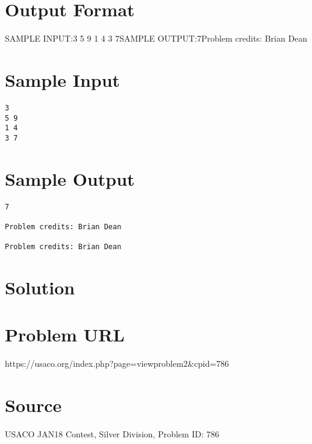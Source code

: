 \documentclass[12pt]{article}
\begin{document}
\section*{Output Format}
SAMPLE INPUT:3
5 9
1 4
3 7SAMPLE OUTPUT:7Problem credits: Brian Dean

\section*{Sample Input}
\begin{verbatim}
3
5 9
1 4
3 7
\end{verbatim}

\section*{Sample Output}
\begin{verbatim}
7

Problem credits: Brian Dean

Problem credits: Brian Dean
\end{verbatim}

\section*{Solution}


\section*{Problem URL}
https://usaco.org/index.php?page=viewproblem2&cpid=786

\section*{Source}
USACO JAN18 Contest, Silver Division, Problem ID: 786
\end{document}
